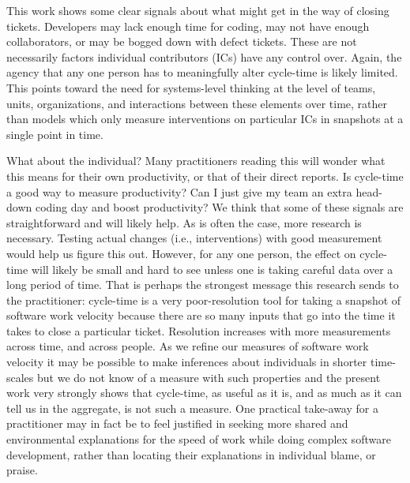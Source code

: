 \documentclass[
]{article}
\begin{document}
This work shows some clear signals about what might get in the way of
closing tickets. Developers may lack enough time for coding, may not
have enough collaborators, or may be bogged down with defect tickets.
These are not necessarily factors individual contributors (ICs) have any
control over. Again, the agency that any one person has to meaningfully
alter cycle-time is likely limited. This points toward the need for
systems-level thinking at the level of teams, units, organizations, and
interactions between these elements over time, rather than models which
only measure interventions on particular ICs in snapshots at a single
point in time.

What about the individual? Many practitioners reading this will wonder
what this means for their own productivity, or that of their direct
reports. Is cycle-time a good way to measure productivity? Can I just
give my team an extra head-down coding day and boost productivity? We
think that some of these signals are straightforward and will likely
help. As is often the case, more research is necessary. Testing actual
changes (i.e., interventions) with good measurement would help us figure
this out. However, for any one person, the effect on cycle-time will
likely be small and hard to see unless one is taking careful data over a
long period of time. That is perhaps the strongest message this research
sends to the practitioner: cycle-time is a very poor-resolution tool for
taking a snapshot of software work velocity because there are so many
inputs that go into the time it takes to close a particular ticket.
Resolution increases with more measurements across time, and across
people. As we refine our measures of software work velocity it may be
possible to make inferences about individuals in shorter time-scales but
we do not know of a measure with such properties and the present work
very strongly shows that cycle-time, as useful as it is, and as much as
it can tell us in the aggregate, is not such a measure. One practical
take-away for a practitioner may in fact be to feel justified in seeking
more shared and environmental explanations for the speed of work while
doing complex software development, rather than locating their
explanations in individual blame, or praise.
\end{document}
